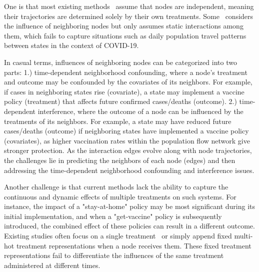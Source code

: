One is that most existing methods~\cite{seedat2022continuous,bica2020crn} assume that nodes are independent, meaning their trajectories are determined solely by their own treatments. 
Some~\cite{anonymous2023cfgode} considers the influence of neighboring nodes but only assumes static interactions among them, which fails to capture situations such as daily population travel patterns between states in the context of COVID-19. 

In casual terms,  influences of neighboring nodes can be categorized into two parts: 1.) time-dependent neighborhood confounding, where a node’s treatment and outcome may be confounded by the covariates of its neighbors.  For example, if cases in neighboring states rise (covariate), a state may implement a vaccine policy (treatment) that affects future confirmed cases/deaths (outcome). 2.) time-dependent interference, where the outcome of a node can be influenced by the treatments of its neighbors. For example, a state may have reduced future cases/deaths (outcome) if neighboring states have implemented a vaccine policy (covariates), as higher vaccination rates within the population flow network give stronger protection.
As the interaction edges evolve along with node trajectories, the challenges lie in predicting the neighbors of each node (edges) and then addressing the time-dependent neighborhood confounding and interference issues.

Another challenge is that current methods lack the ability to capture the continuous and dynamic effects of multiple treatments on such systems. For instance, the impact of a "stay-at-home" policy may be most significant during its initial implementation, and when a "get-vaccine" policy is subsequently introduced, the combined effect of these policies can result in a different outcome. Existing studies often focus on a single treatment~\cite{anonymous2023cfgode,seedat2022continuous} or simply append fixed multi-hot treatment representations when a node receives them. These fixed treatment representations fail to differentiate the influences of the same treatment administered at different times. 


